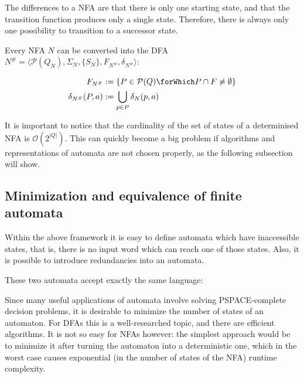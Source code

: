 The differences to a NFA are that there is only one starting state, and that
the transition function produces only a single state.
Therefore, there is always only one possibility to transition to a successor
state.

\begin{definition}
  Every NFA $N$ can be converted into the DFA
  $N^\# = \langle \mathcal{P}(Q_N), \Sigma_N, \{ S_N \}, F_{N^\#}, \delta_{N^\#} \rangle$:

  \begin{align*}
    F_{N^\#} &:= \{ P \in \mathcal{P}(Q) \forWhich P \cap F \neq \emptyset \}\\
    \delta_{N^\#}(P, a) &:= \bigcup_{p \in P} \delta_N(p, a)
  \end{align*}
\end{definition}

It is important to notice that the cardinality of the set of states of a
determinised NFA is $\mathcal{O}(2^{|Q|})$.
This can quickly become a big problem if algorithms and representations of
automata are not chosen properly, as the following subsection will show.

\subsection{Minimization and equivalence of finite automata}

Within the above framework it is easy to define automata which have inaccessible
states, that is, there is no input word which can reach one of those states.
Also, it is possible to introduce redundancies into an automata.

\begin{example}
  These two automata accept exactly the same language:\\
  \center
\end{example}

Since many useful applications of automata involve solving PSPACE-complete
decision problems, it is desirable to minimize the number of states of an
automaton.
For DFAs this is a well-researched topic, and there are efficient algorithms.
It is not so easy for NFAs however: the simplest approach would be to
minimize it after turning the automaton into a deterministic one, which in the
worst case causes exponential (in the number of states of the NFA)
runtime complexity.

